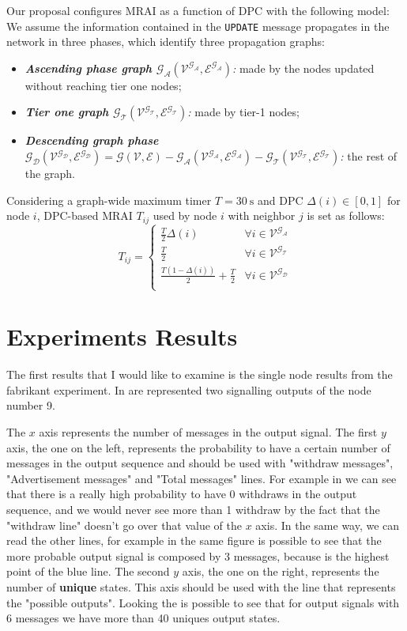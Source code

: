 \documentclass[10pt,conference,letterpaper]{IEEEtran}
\newcommand{\update}{\texttt{UPDATE}\xspace}
\newcommand{\nodeset}{\ensuremath{\mathcal{V}}\xspace}
\newcommand{\edgeset}{\ensuremath{\mathcal{E}}\xspace}
\newcommand{\graph}{\ensuremath{\mathcal{G(\nodeset,\edgeset)}}\xspace}
\newcommand{\ascentg}{\ensuremath{\mathcal{G_{A}}\xspace}}
\newcommand{\ascentnodeset}{\ensuremath{\mathcal{V^{\ascentg}}}\xspace}
\newcommand{\ascentedgeset}{\ensuremath{\mathcal{E^{\ascentg}}}\xspace}
\newcommand{\ascentgraph}{\ensuremath{\mathcal{\ascentg(\ascentnodeset,\ascentedgeset)}}\xspace}
\newcommand{\dpc}{\ensuremath{\Delta}\xspace}
\newcommand{\tierg}{\ensuremath{\mathcal{G_{T}}\xspace}}
\newcommand{\tiernodeset}{\ensuremath{\mathcal{V^{\tierg}}}\xspace}
\newcommand{\tieredgeset}{\ensuremath{\mathcal{E^{\tierg}}}\xspace}
\newcommand{\tiergraph}{\ensuremath{\mathcal{\tierg(\tiernodeset,\tieredgeset)}}\xspace}
\newcommand{\descentg}{\ensuremath{\mathcal{G_{D}}\xspace}}
\newcommand{\descentnodeset}{\ensuremath{\mathcal{V^{\descentg}}}\xspace}
\newcommand{\descentedgeset}{\ensuremath{\mathcal{E^{\descentg}}}\xspace}
\newcommand{\descentgraph}{\ensuremath{\mathcal{\descentg(\descentnodeset,\descentedgeset)}}\xspace}
\begin{document}
Our proposal configures \ac{MRAI} as a function of \ac{DPC} with the following 
model: We assume the information contained in the \update message propagates in 
the network in three phases, which identify three propagation graphs:
\begin{itemize}
    \item \textit{\textbf{Ascending phase graph \ascentgraph}:} made by the 
		nodes updated without reaching tier one nodes;
    \item \textit{\textbf{Tier one graph \tiergraph}:} made by tier-1 nodes;
    \item \textit{\textbf{Descending graph phase $\descentgraph = \graph - \ascentgraph - \tiergraph$}:} 
		the rest of the graph.
\end{itemize}

Considering a graph-wide maximum timer $T=\SI{30}{\second}$ and \ac{DPC} 
$\dpc(i) \in [0,1]$ for node $i$, DPC-based \ac{MRAI} $T_{ij}$ used by node $i$ 
with neighbor $j$ is set as follows:
\begin{equation} \label{eq:dpc}
    T_{ij}=
    \begin{cases}
		\frac{T}{2}\dpc(i) & \forall i\in \ascentnodeset  \\
    \frac{T}{2} & \forall i\in \tiernodeset \\
		\frac{T(1-\dpc(i))}{2}+\frac{T}{2} & \forall i\in \descentnodeset\\
    \end{cases}
\end{equation} 

\section{Experiments Results}
\label{sec:results}

The first results that I would like to examine is the single node
results from the fabrikant experiment.
In  are represented
two signalling outputs of the node number \num{9}.

The $x$ axis represents the number of messages in the output signal.
The first $y$ axis, the one on the left, represents the probability to have a certain
number of messages in the output sequence and should be used with "withdraw
messages", "Advertisement messages" and "Total messages" lines.
For example in  we can see that there is a really
high probability to have \num{0} withdraws in the output sequence, and we would never
see more than 1 withdraw by the fact that the "withdraw line" doesn't go over that
value of the $x$ axis.
In the same way, we can read the other lines, for example in the same figure is
possible to see that the more probable output signal is composed by \num{3} messages,
because is the highest point of the blue line.
The second $y$ axis, the one on the right, represents the number of \textbf{unique}
states.
This axis should be used with the line that represents the "possible outputs".
Looking the  is possible to see that for
output signals with \num{6} messages we have more than \num{40} uniques output
states.
\end{document}
